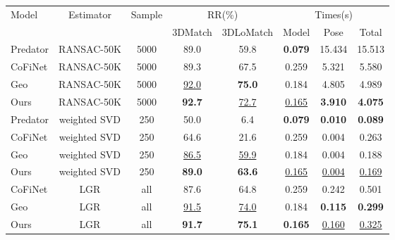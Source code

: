 \begin{table}[htp]
	\renewcommand{\arraystretch}{1}
    \centering
    \label{tab:lgr3dmatch}
    \wuhao
    \begin{tabular}{lccccccc@{}}
    \toprule[1.5pt]
    \multirow{2}{*}{Model} 
    & \multirow{2}{*}{Estimator} 
    & \multirow{2}{*}{Sample} 
    & \multicolumn{2}{c}{RR(\%)}   
    & \multicolumn{3}{c}{Times(s)} \\
                           
    & & 
    &{3DMatch} &{3DLoMatch} 
    &{Model} &{Pose} &{Total}
    \\ 
    \hline
    {Predator} &{RANSAC-50K}  
    &{5000}              
    & 89.0   & 59.8  &  \textbf{0.079}  & 15.434  & 15.513
    \\
    {CoFiNet} &{RANSAC-50K} &{5000} 
    & 89.3   & 67.5  & 0.259            & 5.321   & 5.580
    \\
    {Geo}     &{RANSAC-50K} &{5000}
    & \ul{92.0}   & \textbf{75.0}   & 0.184   & 4.805   & 4.989
    \\
    {Ours}    &{RANSAC-50K} &{5000}
    & \textbf{92.7} & \ul{72.7}   &  \ul{0.165}   & \textbf{3.910}
    & \textbf{4.075}
    \\ 
    \hline
    {Predator}&{weighted SVD} &{250}
    & 50.0   & 6.4   & \textbf{0.079}   & \textbf{0.010}  & \textbf{0.089}
    \\
    {CoFiNet} &{weighted SVD} &{250}
    & 64.6   & 21.6   & 0.259   & 0.004   & 0.263
    \\
    {Geo}     &{weighted SVD} &{250}
    & \ul{86.5}   & \ul{59.9}   & 0.184   & 0.004   & 0.188
    \\
    {Ours}    &{weighted SVD} &{250}
    & \textbf{89.0} & \textbf{63.6} & \ul{0.165}   & \ul{0.004}   & \ul{0.169}
    \\ 
    \hline
    {CoFiNet} &{LGR}  &{all}
    & 87.6   & 64.8  & 0.259   & 0.242   & 0.501
    \\
    {Geo}     &{LGR}  &{all}
    & \ul{91.5}   & \ul{74.0}   & 0.184   & \textbf{0.115}   & \textbf{0.299}   
    \\
    {Ours}    &{LGR}  &{all}
    & \textbf{91.7}  & \textbf{75.1}  & \textbf{0.165}  & \ul{0.160}  & \ul{0.325}
    \\ 
    \bottomrule[1.5pt]
    \end{tabular}
\end{table}